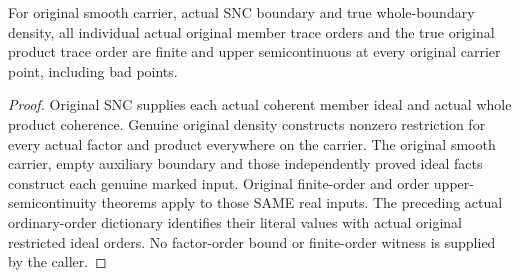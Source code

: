 \begin{theorem}
\label{hir:sharp-original-actual-member-trace-orders-finite-usc}
\leanok
For original smooth carrier, actual SNC boundary and true whole-boundary
density, all individual actual original member trace orders and the
true original product trace order are finite and upper semicontinuous
at every original carrier point, including bad points.
\end{theorem}
\begin{proof}
Original SNC supplies each actual coherent member ideal and actual
whole product coherence. Genuine original density constructs nonzero
restriction for every actual factor and product everywhere on the
carrier. The original smooth carrier, empty auxiliary boundary and
those independently proved ideal facts construct each genuine marked
input. Original finite-order and order upper-semicontinuity theorems
apply to those SAME real inputs. The preceding actual ordinary-order
dictionary identifies their literal values with actual original
restricted ideal orders. No factor-order bound or finite-order witness
is supplied by the caller.
\end{proof}

